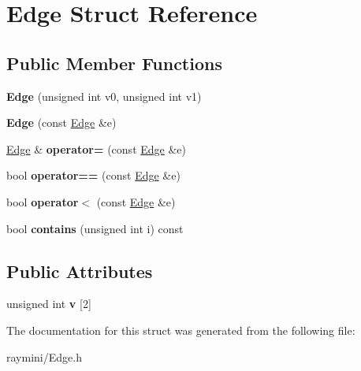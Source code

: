 \hypertarget{struct_edge}{
\section{Edge Struct Reference}
\label{struct_edge}
}
\subsection*{Public Member Functions}
\begin{DoxyCompactItemize}
\item 
\hypertarget{struct_edge_ae799059b5cf7b3a658f5a1f1aae9ac9c}{
{\bfseries Edge} (unsigned int v0, unsigned int v1)}
\label{struct_edge_ae799059b5cf7b3a658f5a1f1aae9ac9c}

\item 
\hypertarget{struct_edge_a70ed9f4d5f93c9cc5273a34361781532}{
{\bfseries Edge} (const \hyperlink{struct_edge}{Edge} \&e)}
\label{struct_edge_a70ed9f4d5f93c9cc5273a34361781532}

\item 
\hypertarget{struct_edge_a2fba79ccfba97323171b31c7f395c969}{
\hyperlink{struct_edge}{Edge} \& {\bfseries operator=} (const \hyperlink{struct_edge}{Edge} \&e)}
\label{struct_edge_a2fba79ccfba97323171b31c7f395c969}

\item 
\hypertarget{struct_edge_ae7d4e4cdbf2023b9dfa1c8162ace412f}{
bool {\bfseries operator==} (const \hyperlink{struct_edge}{Edge} \&e)}
\label{struct_edge_ae7d4e4cdbf2023b9dfa1c8162ace412f}

\item 
\hypertarget{struct_edge_a1f5f87db716a267d8c7243d42d00fb66}{
bool {\bfseries operator$<$} (const \hyperlink{struct_edge}{Edge} \&e)}
\label{struct_edge_a1f5f87db716a267d8c7243d42d00fb66}

\item 
\hypertarget{struct_edge_a9299b6cacd09cfb078165e512ccd756d}{
bool {\bfseries contains} (unsigned int i) const }
\label{struct_edge_a9299b6cacd09cfb078165e512ccd756d}

\end{DoxyCompactItemize}
\subsection*{Public Attributes}
\begin{DoxyCompactItemize}
\item 
\hypertarget{struct_edge_aa4a9380430efd1ae82616f7ef75a281c}{
unsigned int {\bfseries v} \mbox{[}2\mbox{]}}
\label{struct_edge_aa4a9380430efd1ae82616f7ef75a281c}

\end{DoxyCompactItemize}


The documentation for this struct was generated from the following file:\begin{DoxyCompactItemize}
\item 
raymini/Edge.h\end{DoxyCompactItemize}
